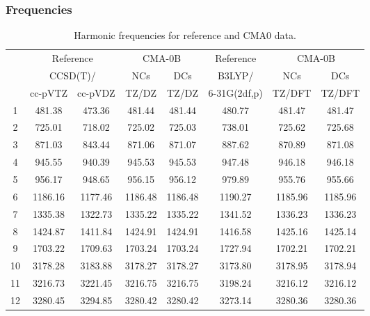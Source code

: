 \documentclass[10pt,oneside]{article}
\begin{document}
\clearpage

\subsubsection*{Frequencies}
\begin{table}[h!]
\centering
\caption{Harmonic frequencies for reference and CMA0 data.}
\begin{tabular}{cccccccc}
\toprule
{} & \multicolumn{2}{c}{Reference} & \multicolumn{2}{c}{CMA-0B} &    Reference & \multicolumn{2}{c}{CMA-0B} \\
{} & \multicolumn{2}{c}{CCSD(T)/} &     NCs &     DCs &       B3LYP/ &     NCs &     DCs \\
{} &   cc-pVTZ & cc-pVDZ &   TZ/DZ &   TZ/DZ & 6-31G(2df,p) &  TZ/DFT &  TZ/DFT \\
\midrule
1  &    481.38 &  473.36 &  481.44 &  481.44 &       480.77 &  481.47 &  481.47 \\
2  &    725.01 &  718.02 &  725.02 &  725.03 &       738.01 &  725.62 &  725.68 \\
3  &    871.03 &  843.44 &  871.06 &  871.07 &       887.62 &  870.89 &  871.08 \\
4  &    945.55 &  940.39 &  945.53 &  945.53 &       947.48 &  946.18 &  946.18 \\
5  &    956.17 &  948.65 &  956.15 &  956.12 &       979.89 &  955.76 &  955.66 \\
6  &   1186.16 & 1177.46 & 1186.48 & 1186.48 &      1190.27 & 1185.96 & 1185.96 \\
7  &   1335.38 & 1322.73 & 1335.22 & 1335.22 &      1341.52 & 1336.23 & 1336.23 \\
8  &   1424.87 & 1411.84 & 1424.91 & 1424.91 &      1416.58 & 1425.16 & 1425.14 \\
9  &   1703.22 & 1709.63 & 1703.24 & 1703.24 &      1727.94 & 1702.21 & 1702.21 \\
10 &   3178.28 & 3183.88 & 3178.27 & 3178.27 &      3173.80 & 3178.95 & 3178.94 \\
11 &   3216.73 & 3221.45 & 3216.75 & 3216.75 &      3198.24 & 3216.12 & 3216.12 \\
12 &   3280.45 & 3294.85 & 3280.42 & 3280.42 &      3273.14 & 3280.36 & 3280.36 \\
\bottomrule
\end{tabular}
\end{table}

\clearpage
\end{document}
